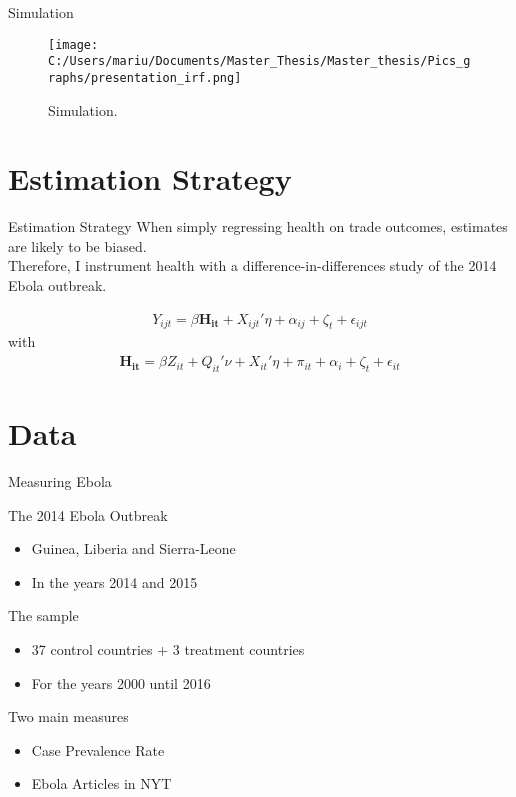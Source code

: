 \documentclass[11pt]{beamer}
\begin{document}
\begin{frame}{Simulation}
\begin{figure}[!ht]
\begin{center} 
\begin{minipage}[t]{\textwidth}
\texttt{[image: C:/Users/mariu/Documents/Master\_Thesis/Master\_thesis/Pics\_graphs/presentation\_irf.png]}\\
\caption{Simulation.\label{Simulation Evidence}}
\end{minipage}
\end{center}
\end{figure}
\end{frame}

\section{Estimation Strategy}

\begin{frame}{Estimation Strategy}
When simply regressing health on trade outcomes, estimates are likely to be biased.  \\ \vspace{0.5cm}
Therefore, I instrument health with a difference-in-differences study of the 2014 Ebola outbreak.

\begin{align}
Y_{ijt} =  \beta \mathbf{H_{it}} +  X_{ijt}'\eta + \alpha_{ij} + \zeta_t + \epsilon_{ijt}
\end{align}
with 
\begin{align}
\mathbf{H_{it}} =  \beta Z_{it} +  Q_{it}'\nu + X_{it}'\eta + \pi_{it} + \alpha_i + \zeta_t + \epsilon_{it}
\end{align}

\end{frame}



\section{Data}

\begin{frame}{Measuring Ebola}

The 2014 Ebola Outbreak
\begin{itemize}
\item Guinea, Liberia and Sierra-Leone
\item In the years 2014 and 2015
\end{itemize}

The sample
\begin{itemize}
\item 37 control countries + 3 treatment countries
\item For the years 2000 until 2016
\end{itemize}

Two main measures
\begin{itemize}
\item Case Prevalence Rate
\item Ebola Articles in NYT
\end{itemize}

\end{frame}
\end{document}
